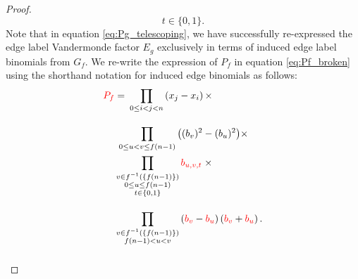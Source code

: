 \begin{proof}
\[{t\in\{0,1\}.
}
\]
Note that in equation \ref{eq:Pg_telescoping}, we have successfully re-expressed the edge label Vandermonde factor $E_g$ exclusively in terms of induced edge label binomials from $G_f$. We re-write the expression of $P_f$ in equation \eqref{eq:Pf_broken} using the shorthand notation for induced edge binomials as follows:
\begin{equation}
\begin{aligned}{\color{red}P_{f}} & =\:\prod_{0\leq i<j<n}\left(x_{j}-x_{i}\right)\times\\[10pt]
 & \;\prod_{0\leq u<v\leq f\left(n-1\right)}\big((b_{v})^{2}-(b_{u})^{2}\big)\times\\
 & \prod_{\substack{v\in f^{-1}\left(\{f(n-1)\}\right)\\
0\leq u\leq f(n-1)\\
t\in\{0,1\}
}
}{\color{red}b_{u,v,t}}\;\times\\[10pt]
 & \prod_{\substack{v\in f^{-1}\left(\{f(n-1)\}\right)\\
f(n-1)<u<v
}
}\left({\color{red}b_{v}}-{\color{red}b_{u}}\right)\left({\color{red}b_{v}}+{\color{red}b_{u}}\right).\\[10pt]
\end{aligned}
\label{eq:Pf_rewrite}
\end{equation}


\end{proof}
